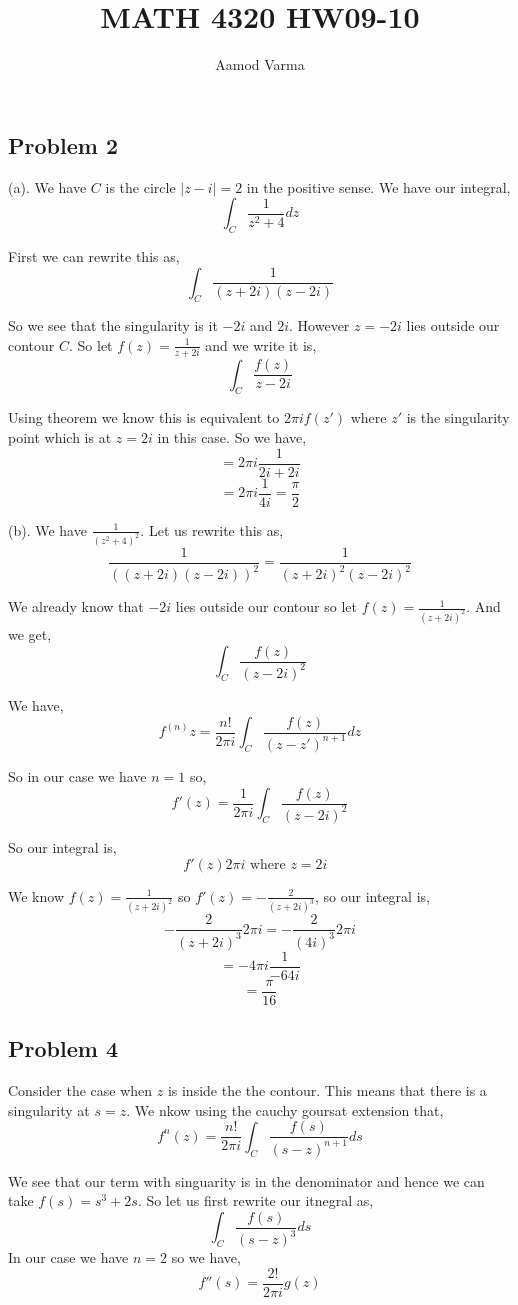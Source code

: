 \documentclass[a4paper]{report}
\title{MATH 4320 HW09-10}
\author{Aamod Varma}
\begin{document}
\maketitle

\subsection*{Problem 2}
(a). We have $C$ is the circle $|z - i|  = 2$ in the positive sense. We have our integral, 
$$ \int_C \frac{1}{z^2 + 4}dz $$ 

First we can rewrite this as,
$$ \int_C \frac{1}{(z + 2i)(z - 2i)} $$ 

So we see that the singularity is it $-2i$ and $2i$. However $z = -2i$ lies outside our contour $C$. So let $f(z) = \frac{1}{z + 2i}$ and we write it is, 
$$ \int_C \frac{f(z)}{z - 2i} $$ 

Using theorem we know this is equivalent to $2\pi i f(z')$ where $z'$ is the singularity point which is at $z = 2i$ in this case. So we have, 
$$ = 2\pi i \frac{1}{2i + 2i} $$ 
$$ = 2\pi i \frac{1}{4i} = \frac{\pi}{2} $$ 


(b). We have $\frac{1}{(z^2+4)^2}$. Let us rewrite this as, 
$$ \frac{1}{((z + 2i)(z - 2i))^2} = \frac{1}{(z + 2i)^2(z - 2i)^2}  $$ 

We already know that $-2i$ lies outside our contour so let $f(z) = \frac{1}{(z + 2i)^2}$. And we get, 
$$ \int_C \frac{f(z)}{(z - 2i)^2} $$ 

We have, 
$$ f^{(n)}z = \frac{n!}{2\pi i} \int_C \frac{f(z)}{(z - z')^{n + 1}}dz $$ 

So in our case we have $n = 1$ so, 
$$ f'(z) = \frac{1}{2\pi i} \int_C \frac{f(z)}{(z - 2i)^2} $$ 

So our integral is, 
$$ f'(z) 2 \pi i \text{ where $z = 2i$ } $$

We know $f(z) = \frac{1}{(z + 2i)^2}$ so $f'(z) = -\frac{2}{(z + 2i)^{3}}$, so our integral is, 
$$ -\frac{2}{(z + 2i)^3} 2\pi i = -\frac{2}{(4i)^{3}} 2 \pi i $$ 
$$ = -4\pi i \frac{1}{-64i} $$ 
$$ = \frac{\pi}{16} $$ 
\subsection*{Problem 4}
Consider the case when $z$ is inside the the contour. This means that there is a singularity at $s = z$. We nkow using the cauchy goursat extension that, 
$$ f^{n}(z) = \frac{n!}{2\pi i}\int_C \frac{f(s)}{(s - z)^{n + 1}} ds$$ 

We see that our term with singuarity is in the denominator and hence we can take $f(s) = s^{3} + 2s$. So let us first rewrite our itnegral as, 
$$ \int_C \frac{f(s)}{(s - z)^{3}}ds $$ 
In our case we have $n = 2$ so we have,  
$$ f''(s) = \frac{2!}{2\pi i} g(z) $$
\end{document}
